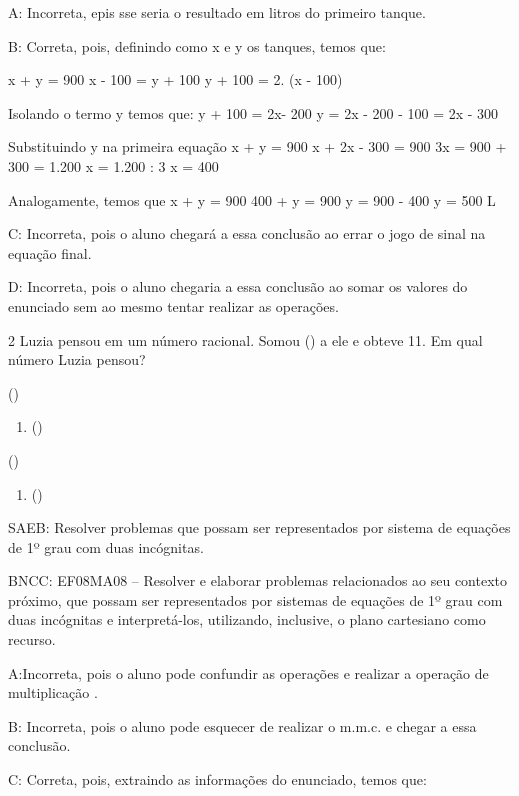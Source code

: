 {A: Incorreta, epis sse seria o resultado em litros do primeiro tanque.

B: Correta, pois, definindo como x e y os tanques, temos que:

x + y = 900 x - 100 = y + 100 y + 100 = 2. (x - 100)

Isolando o termo y temos que: y + 100 = 2x- 200 y = 2x - 200 - 100 = 2x
- 300

Substituindo y na primeira equação x + y = 900 x + 2x - 300 = 900 3x =
900 + 300 = 1.200 x = 1.200 : 3 x = 400

Analogamente, temos que x + y = 900 400 + y = 900 y = 900 - 400 y = 500
L

C: Incorreta, pois o aluno chegará a essa conclusão ao errar o jogo de
sinal na equação final.

D: Incorreta, pois o aluno chegaria a essa conclusão ao somar os valores
do enunciado sem ao mesmo tentar realizar as operações.

\num{2} Luzia pensou em um número racional. Somou () a ele e
obteve 11. Em qual número Luzia pensou?
\item ()

\begin{enumerate}
\def\labelenumi{\alph{enumi})}
\setcounter{enumi}{1}
\tightlist
\item
  ()
\end{enumerate}
\item ()

\begin{enumerate}
\def\labelenumi{\alph{enumi})}
\setcounter{enumi}{3}
\tightlist
\item
  ()
\end{enumerate}

SAEB: Resolver problemas que possam ser representados por sistema de
equações de 1º grau com duas incógnitas.

BNCC: EF08MA08 -- Resolver e elaborar problemas relacionados ao seu
contexto próximo, que possam ser representados por sistemas de equações
de 1º grau com duas incógnitas e interpretá-los, utilizando, inclusive,
o plano cartesiano como recurso.

A:Incorreta, pois o aluno pode confundir as operações e realizar a
operação de multiplicação .

B: Incorreta, pois o aluno pode esquecer de realizar o m.m.c. e chegar a
essa conclusão.

C: Correta, pois, extraindo as informações do enunciado, temos que:

}
